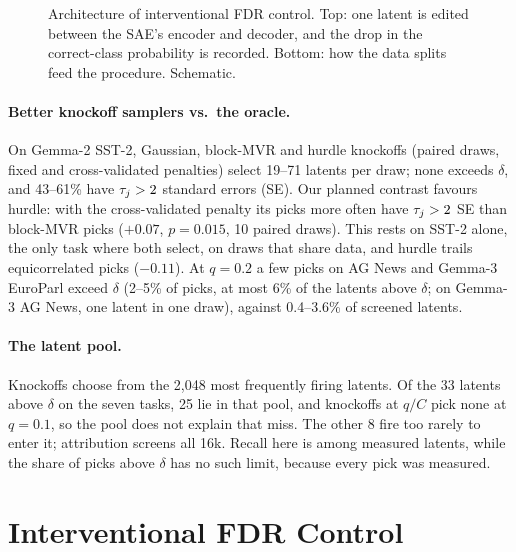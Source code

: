 \begin{figure}[t]
\centering
{}
\caption{Architecture of interventional FDR control. Top: one latent is edited between the SAE's encoder and decoder, and the
drop in the correct-class probability is recorded. Bottom: how the data splits feed the procedure. Schematic.}
\label{fig:pipeline}
\end{figure}

\paragraph{Better knockoff samplers vs.\ the oracle.} On Gemma-2 SST-2, Gaussian, block-MVR and hurdle knockoffs (paired draws,
fixed and cross-validated penalties) select 19--71 latents per draw; none exceeds $\delta$, and 43--61\% have $\tau_j > 2$ standard errors (SE). Our
planned contrast favours hurdle: with the cross-validated penalty its picks more often have $\tau_j > 2$ SE than block-MVR picks
($+0.07$, $p = 0.015$, 10 paired draws). This rests on SST-2 alone, the only task where both select, on draws that share data, and
hurdle trails equicorrelated picks ($-0.11$). At $q = 0.2$ a few picks on AG News and Gemma-3 EuroParl exceed $\delta$ (2--5\% of
picks, at most 6\% of the latents above $\delta$; on Gemma-3 AG News, one latent in one draw), against 0.4--3.6\% of screened latents.

\paragraph{The latent pool.} Knockoffs choose from the 2,048 most frequently firing latents. Of the 33 latents above $\delta$ on
the seven tasks, 25 lie in that pool, and knockoffs at $q/C$ pick none at $q = 0.1$, so the pool does not explain that miss. The other 8
fire too rarely to enter it; attribution screens all 16k. Recall here is among measured latents, while the share of picks above
$\delta$ has no such limit, because every pick was measured.

\section{Interventional FDR Control}
\label{sec:method}

